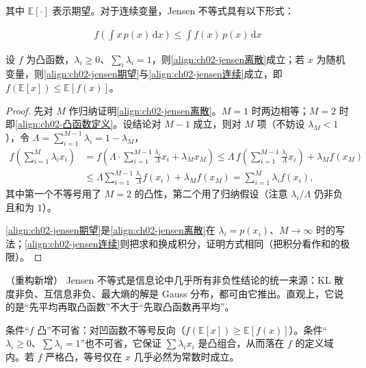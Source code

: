 \documentclass[../../main.tex]{subfiles}
\begin{document}
其中 $\mathbb{E}[\cdot]$ 表示期望。对于连续变量，Jensen 不等式具有以下形式：

\begin{align}
  f\left(\int x\,p(x)\,\mathrm{d}x\right) \leqslant \int f(x)\,p(x)\,\mathrm{d}x
  \label{align:ch02-jensen连续}
\end{align}

\begin{theorem}\label{theorem:ch02-jensen}
设 $f$ 为凸函数，$\lambda_i\geqslant0$、$\sum_i\lambda_i=1$，则\eqref{align:ch02-jensen离散}成立；若 $x$ 为随机变量，则\eqref{align:ch02-jensen期望}与\eqref{align:ch02-jensen连续}成立，即 $f(\mathbb{E}[x])\leqslant\mathbb{E}[f(x)]$。
\end{theorem}

\begin{proof}
先对 $M$ 作归纳证明\eqref{align:ch02-jensen离散}。$M=1$ 时两边相等；$M=2$ 时即\eqref{align:ch02-凸函数定义}。设结论对 $M-1$ 成立，则对 $M$ 项（不妨设 $\lambda_M<1$），令 $\Lambda=\sum_{i=1}^{M-1}\lambda_i=1-\lambda_M$，
\begin{align*}
  f\left(\sum_{i=1}^{M}\lambda_ix_i\right)
  &= f\left(\Lambda\cdot\sum_{i=1}^{M-1}\frac{\lambda_i}{\Lambda}x_i + \lambda_Mx_M\right)
  \leqslant \Lambda\,f\left(\sum_{i=1}^{M-1}\frac{\lambda_i}{\Lambda}x_i\right) + \lambda_Mf(x_M) \\
  &\leqslant \Lambda\sum_{i=1}^{M-1}\frac{\lambda_i}{\Lambda}f(x_i) + \lambda_Mf(x_M)
  = \sum_{i=1}^{M}\lambda_if(x_i) ,
\end{align*}
其中第一个不等号用了 $M=2$ 的凸性，第二个用了归纳假设（注意 $\lambda_i/\Lambda$ 仍非负且和为 $1$）。

\eqref{align:ch02-jensen期望}是\eqref{align:ch02-jensen离散}在 $\lambda_i=p(x_i)$、$M\to\infty$ 时的写法；\eqref{align:ch02-jensen连续}则把求和换成积分，证明方式相同（把积分看作和的极限）。
\end{proof}

\begin{remark}（重构新增）
Jensen 不等式是信息论中几乎所有非负性结论的统一来源：KL 散度非负、互信息非负、最大熵的解是 Gauss 分布，都可由它推出。直观上，它说的是“先平均再取凸函数”不大于“先取凸函数再平均”。

条件“$f$ 凸”不可省：对凹函数不等号反向（$f(\mathbb{E}[x])\geqslant\mathbb{E}[f(x)]$）。条件“$\lambda_i\geqslant0$、$\sum\lambda_i=1$”也不可省，它保证 $\sum\lambda_ix_i$ 是凸组合，从而落在 $f$ 的定义域内。若 $f$ 严格凸，等号仅在 $x$ 几乎必然为常数时成立。
\end{remark}
\end{document}

